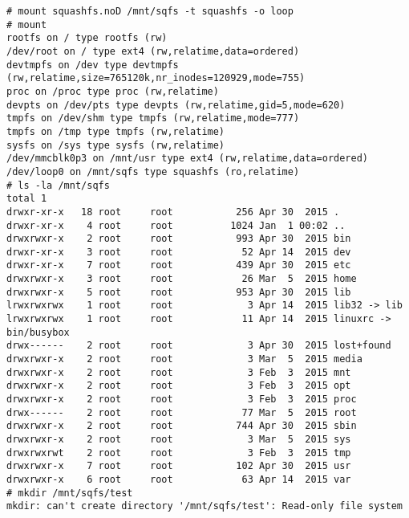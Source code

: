\begin{lstlisting}[style=Bash,caption=squashfs.noD]
# mount squashfs.noD /mnt/sqfs -t squashfs -o loop
# mount
rootfs on / type rootfs (rw)
/dev/root on / type ext4 (rw,relatime,data=ordered)
devtmpfs on /dev type devtmpfs (rw,relatime,size=765120k,nr_inodes=120929,mode=755)
proc on /proc type proc (rw,relatime)
devpts on /dev/pts type devpts (rw,relatime,gid=5,mode=620)
tmpfs on /dev/shm type tmpfs (rw,relatime,mode=777)
tmpfs on /tmp type tmpfs (rw,relatime)
sysfs on /sys type sysfs (rw,relatime)
/dev/mmcblk0p3 on /mnt/usr type ext4 (rw,relatime,data=ordered)
/dev/loop0 on /mnt/sqfs type squashfs (ro,relatime)
# ls -la /mnt/sqfs
total 1
drwxr-xr-x   18 root     root           256 Apr 30  2015 .
drwxr-xr-x    4 root     root          1024 Jan  1 00:02 ..
drwxrwxr-x    2 root     root           993 Apr 30  2015 bin
drwxr-xr-x    3 root     root            52 Apr 14  2015 dev
drwxr-xr-x    7 root     root           439 Apr 30  2015 etc
drwxrwxr-x    3 root     root            26 Mar  5  2015 home
drwxrwxr-x    5 root     root           953 Apr 30  2015 lib
lrwxrwxrwx    1 root     root             3 Apr 14  2015 lib32 -> lib
lrwxrwxrwx    1 root     root            11 Apr 14  2015 linuxrc -> bin/busybox
drwx------    2 root     root             3 Apr 30  2015 lost+found
drwxrwxr-x    2 root     root             3 Mar  5  2015 media
drwxrwxr-x    2 root     root             3 Feb  3  2015 mnt
drwxrwxr-x    2 root     root             3 Feb  3  2015 opt
drwxrwxr-x    2 root     root             3 Feb  3  2015 proc
drwx------    2 root     root            77 Mar  5  2015 root
drwxrwxr-x    2 root     root           744 Apr 30  2015 sbin
drwxrwxr-x    2 root     root             3 Mar  5  2015 sys
drwxrwxrwt    2 root     root             3 Feb  3  2015 tmp
drwxrwxr-x    7 root     root           102 Apr 30  2015 usr
drwxrwxr-x    6 root     root            63 Apr 14  2015 var
# mkdir /mnt/sqfs/test
mkdir: can't create directory '/mnt/sqfs/test': Read-only file system
\end{lstlisting}

